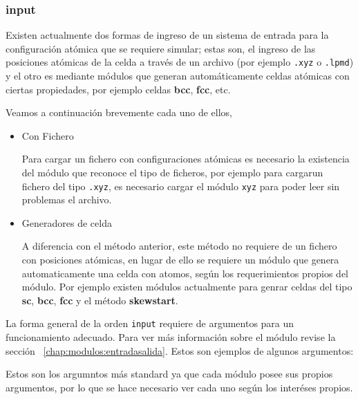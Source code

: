 \subsubsection{input}

Existen actualmente dos formas de ingreso de un sistema de entrada para la configuraci\'on at\'omica que se requiere simular; estas son, el ingreso de las posiciones at\'omicas de la celda a trav\'es de un archivo (por ejemplo \verb|.xyz| o \verb|.lpmd|) y el otro es mediante m\'odulos que generan autom\'aticamente celdas at\'omicas con ciertas propiedades, por ejemplo celdas \textbf{bcc}, \textbf{fcc}, etc.

Veamos a continuaci\'on brevemente cada uno de ellos,

\begin{itemize}
 \item{Con Fichero}

Para cargar un fichero con configuraciones at\'omicas es necesario la existencia del m\'odulo que reconoce el tipo de ficheros, por ejemplo para cargarun fichero del tipo \verb|.xyz|, es necesario cargar el m\'odulo \verb|xyz| para poder leer sin problemas el archivo. 
  \item{Generadores de celda}

A diferencia con el m\'etodo anterior, este m\'etodo no requiere de un fichero con posiciones at\'omicas, en lugar de ello se requiere un m\'odulo que genera automaticamente una celda con atomos, seg\'un los requerimientos propios del m\'odulo. Por ejemplo existen m\'odulos actualmente para genrar celdas del tipo \textbf{sc}, \textbf{bcc}, \textbf{fcc} y el m\'etodo \textbf{skewstart}.

\end{itemize}

La forma general de la orden \verb|input| requiere de argumentos para un funcionamiento adecuado. Para ver m\'as informaci\'on sobre el m\'odulo revise la secci\'on ~\ref{chap:modulos:entradasalida}. Estos son ejemplos de algunos argumentos:


Estos son los argumntos m\'as standard ya que cada m\'odulo posee sus propios argumentos, por lo que se hace necesario ver cada uno seg\'un los inter\'eses propios.


